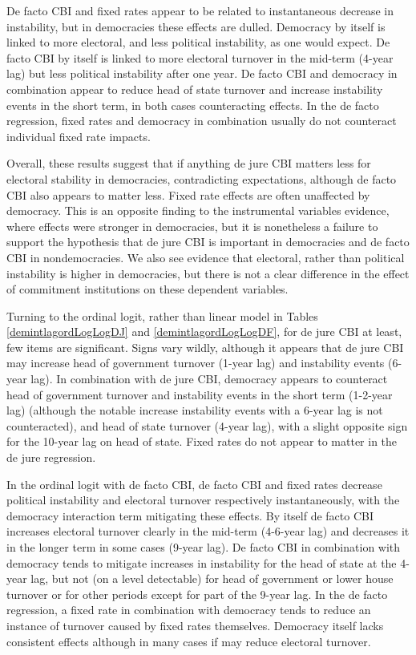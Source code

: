 \documentclass{article}
\begin{document}
    De facto CBI and fixed rates appear to be related to instantaneous decrease in instability, but in democracies these effects are dulled. Democracy by itself is linked to more electoral, and less political instability, as one would expect. De facto CBI by itself is linked to more electoral turnover in the mid-term (4-year lag) but less political instability after one year.  De facto CBI and democracy in combination appear to reduce head of state turnover and increase instability events in the short term, in both cases counteracting effects. In the de facto regression, fixed rates and democracy in combination usually do not counteract individual fixed rate impacts.

    Overall, these results suggest that if anything de jure CBI matters less for electoral stability in democracies, contradicting expectations, although de facto CBI also appears to matter less. Fixed rate effects are often unaffected by democracy. This is an opposite finding to the instrumental variables evidence, where effects were stronger in democracies, but it is nonetheless a failure to support the hypothesis that de jure CBI is important in democracies and de facto CBI in nondemocracies. We also see evidence that electoral, rather than political instability is higher in democracies, but there is not a clear difference in the effect of commitment institutions on these dependent variables.

    Turning to the ordinal logit, rather than linear model in Tables \ref*{demintlagordLogLogDJ} and \ref*{demintlagordLogLogDF}, for de jure CBI at least, few items are significant. Signs vary wildly, although it appears that de jure CBI may increase head of government turnover (1-year lag) and instability events (6-year lag). In combination with de jure CBI, democracy appears to counteract head of government turnover and instability events in the short term (1-2-year lag) (although the notable increase instability events with a 6-year lag is not counteracted), and head of state turnover (4-year lag), with a slight opposite sign for the 10-year lag on head of state. Fixed rates do not appear to matter in the de jure regression.

    In the ordinal logit with de facto CBI, de facto CBI and fixed rates decrease political instability and electoral turnover respectively instantaneously, with the democracy interaction term mitigating these effects. By itself de facto CBI increases electoral turnover clearly in the mid-term (4-6-year lag) and decreases it in the longer term in some cases (9-year lag). De facto CBI in combination with democracy tends to mitigate increases in instability for the head of state at the 4-year lag, but not (on a level detectable) for head of government or lower house turnover or for other periods except for part of the 9-year lag. In the de facto regression, a fixed rate in combination with democracy tends to reduce an instance of turnover caused by fixed rates themselves. Democracy itself lacks consistent effects although in many cases if may reduce electoral turnover.
\end{document}
